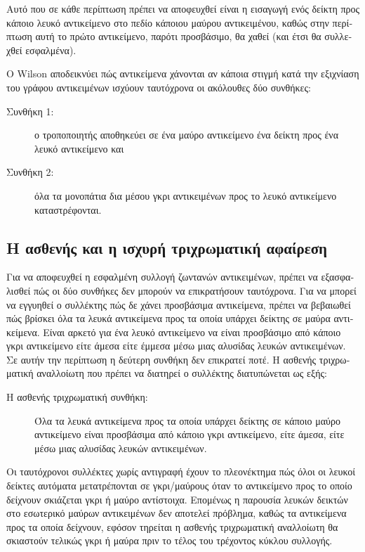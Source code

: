 \begin{greek}
Αυτό που σε κάθε περίπτωση πρέπει να αποφευχθεί είναι η εισαγωγή
ενός δείκτη προς κάποιο λευκό αντικείμενο στο πεδίο κάποιου μαύρου 
αντικειμένου, καθώς στην περίπτωση αυτή το πρώτο αντικείμενο, παρότι
προσβάσιμο, θα χαθεί (και έτσι θα συλλεχθεί εσφαλμένα).

Ο Wilson \cite{DBLP:conf/iwmm/Wilson92} αποδεικνύει πώς αντικείμενα
χάνονται αν κάποια στιγμή κατά την εξιχνίαση του γράφου αντικειμένων
ισχύουν ταυτόχρονα οι ακόλουθες δύο συνθήκες:

\begin{description}
  \item[Συνθήκη 1:] ο τροποποιητής αποθηκεύει σε ένα μαύρο αντικείμενο
                    ένα δείκτη προς ένα λευκό αντικείμενο και
  \item[Συνθήκη 2:] όλα τα μονοπάτια δια μέσου γκρι αντικειμένων προς
                    το λευκό αντικείμενο καταστρέφονται.
\end{description}

\subsection{Η ασθενής και η ισχυρή τριχρωματική αφαίρεση}
Για να αποφευχθεί η εσφαλμένη συλλογή ζωντανών αντικειμένων,
πρέπει να εξασφαλισθεί πώς οι δύο συνθήκες δεν μπορούν να
επικρατήσουν ταυτόχρονα. Για να μπορεί να εγγυηθεί ο συλλέκτης
πώς δε χάνει προσβάσιμα αντικείμενα, πρέπει να βεβαιωθεί πώς
βρίσκει όλα τα λευκά αντικείμενα προς τα οποία υπάρχει δείκτης
σε μαύρα αντικείμενα. Είναι αρκετό για ένα λευκό αντικείμενο
να είναι προσβάσιμο από κάποιο γκρι αντικείμενο είτε άμεσα
είτε έμμεσα μέσω μιας αλυσίδας λευκών αντικειμένων. Σε αυτήν
την περίπτωση η δεύτερη συνθήκη δεν επικρατεί ποτέ. Η ασθενής
τριχρωματική αναλλοίωτη που πρέπει να διατηρεί ο συλλέκτης
διατυπώνεται ως εξής:

\begin{description}
  \item[Η ασθενής τριχρωματική συνθήκη:] Όλα τα λευκά αντικείμενα
        προς τα οποία υπάρχει δείκτης σε κάποιο μαύρο αντικείμενο
        είναι προσβάσιμα από κάποιο γκρι αντικείμενο, είτε άμεσα,
        είτε μέσω μιας αλυσίδας λευκών αντικειμένων.
\end{description}

Οι ταυτόχρονοι συλλέκτες χωρίς αντιγραφή έχουν το πλεονέκτημα
πώς όλοι οι λευκοί δείκτες αυτόματα μετατρέπονται σε γκρι/μαύρους
όταν το αντικείμενο προς το οποίο δείχνουν σκιάζεται γκρι ή
μαύρο αντίστοιχα. Επομένως η παρουσία λευκών δεικτών στο εσωτερικό
μαύρων αντικειμένων δεν αποτελεί πρόβλημα, καθώς τα αντικείμενα
προς τα οποία δείχνουν, εφόσον τηρείται η ασθενής τριχρωματική
αναλλοίωτη θα σκιαστούν τελικώς γκρι ή μαύρα πριν το τέλος του
τρέχοντος κύκλου συλλογής.


\end{greek}
